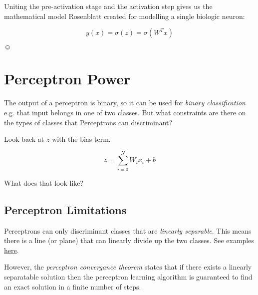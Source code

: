 \documentclass[letterpaper,12pt]{article}
\begin{document}
Uniting the pre-activation stage and the activation step gives us the
mathematical model Rosenblatt created for modelling a single biologic neuron:

\[
    y(x) = \sigma(z) =  \sigma(W^{T}x)
\]

$\smiley$

\section{Perceptron Power}

The output of a perceptron is binary, so it can be used for \emph{binary
classification} e.g. that input belongs in one of two classes. But what
constraints are there on the types of classes that Perceptrons can discriminant?

Look back at $z$ with the bias term.

\[
    z = \sum_{i=0}^{N} W_i x_i + b
\]

What does that look like?

\subsection{Perceptron Limitations}

Perceptrons can only discriminant classes that are \emph{linearly separable}.
This means there is a line (or plane) that can linearly divide up the two
classes. See examples \href{https://en.wikipedia.org/wiki/Linear_separability}{here}.

However, the \emph{perceptron convergance theorem} states that if there exists
a linearly separatable solution then the perceptron learning algorithm is
guaranteed to find an exact solution in a finite number of steps.
\end{document}
